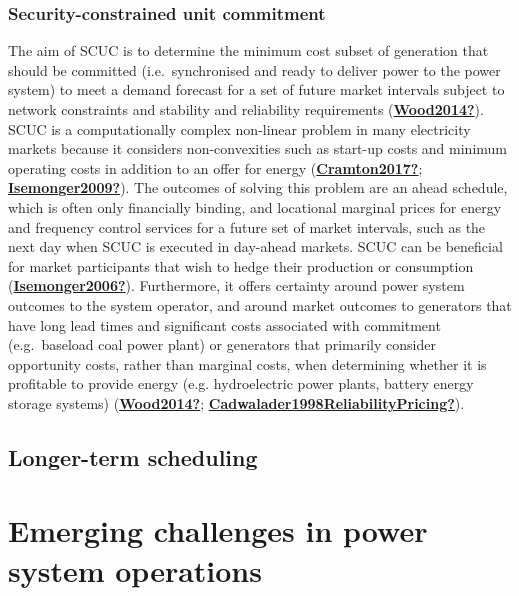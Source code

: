 \documentclass[12pt,a4paper,]{report}
\begin{document}
\hypertarget{security-constrained-unit-commitment}{%
\subsubsection{Security-constrained unit
commitment}\label{security-constrained-unit-commitment}}

The aim of SCUC is to determine the minimum cost subset of generation
that should be committed (i.e.~synchronised and ready to deliver power
to the power system) to meet a demand forecast for a set of future
market intervals subject to network constraints and stability and
reliability requirements
(\protect\hyperlink{ref-Wood2014}{\textbf{Wood2014?}}). SCUC is a
computationally complex non-linear problem in many electricity markets
because it considers non-convexities such as start-up costs and minimum
operating costs in addition to an offer for energy
(\protect\hyperlink{ref-Cramton2017}{\textbf{Cramton2017?}};
\protect\hyperlink{ref-Isemonger2009}{\textbf{Isemonger2009?}}). The
outcomes of solving this problem are an ahead schedule, which is often
only financially binding, and locational marginal prices for energy and
frequency control services for a future set of market intervals, such as
the next day when SCUC is executed in day-ahead markets. SCUC can be
beneficial for market participants that wish to hedge their production
or consumption
(\protect\hyperlink{ref-Isemonger2006}{\textbf{Isemonger2006?}}).
Furthermore, it offers certainty around power system outcomes to the
system operator, and around market outcomes to generators that have long
lead times and significant costs associated with commitment
(e.g.~baseload coal power plant) or generators that primarily consider
opportunity costs, rather than marginal costs, when determining whether
it is profitable to provide energy (e.g. hydroelectric power plants,
battery energy storage systems)
(\protect\hyperlink{ref-Wood2014}{\textbf{Wood2014?}};
\protect\hyperlink{ref-Cadwalader1998ReliabilityPricing}{\textbf{Cadwalader1998ReliabilityPricing?}}).

\hypertarget{longer-term-scheduling}{%
\subsection{Longer-term scheduling}\label{longer-term-scheduling}}

\hypertarget{emerging-challenges-in-power-system-operations}{%
\section{Emerging challenges in power system
operations}\label{emerging-challenges-in-power-system-operations}}
\end{document}
